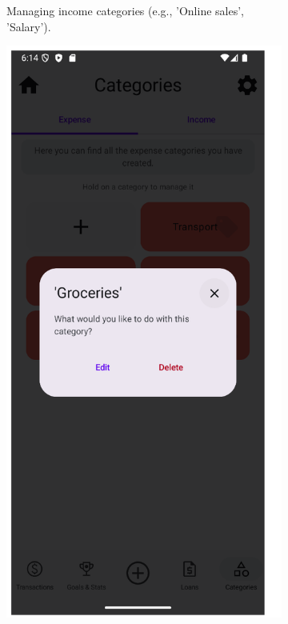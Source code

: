 \documentclass[a4paper,12pt]{article}
\begin{document}
\begin{figure}[H]
\begin{subfigure}[b]{0.23\textwidth}
        \caption{Managing income categories (e.g., 'Online sales', 'Salary').}
        \label{fig:categories_income}
    \end{subfigure}
    \hfill
    \begin{subfigure}[b]{0.23\textwidth}
        \includegraphics[width=\textwidth]{categories_interaction_dialog.png}

\end{subfigure}
\end{figure}
\end{document}
